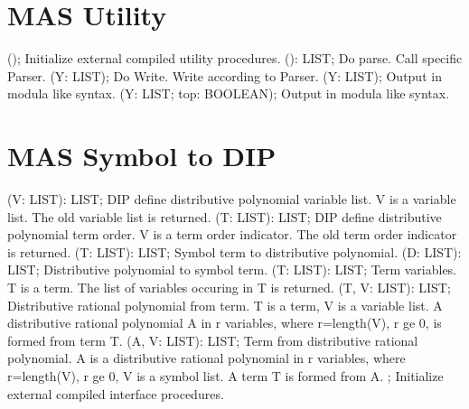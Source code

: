 \section{ MAS Utility  } 
 (); \eproc
\bcom Initialize external compiled utility procedures.  \ecom 
{} (): LIST; \eproc
\bcom Do parse. Call specific Parser.  \ecom 
{} (Y: LIST); \eproc
\bcom Do Write. Write according to Parser.  \ecom 
{} (Y: LIST); \eproc
\bcom Output in modula like syntax.  \ecom 
{} (Y: LIST; top: BOOLEAN); \eproc
\bcom Output in modula like syntax.  \ecom 
\section{ MAS Symbol to DIP  } 
 (V: LIST): LIST; \eproc
\bcom DIP define distributive polynomial variable list.
V is a variable list. The old variable list is returned.  \ecom 
{} (T: LIST): LIST; \eproc
\bcom DIP define distributive polynomial term order.
V is a term order indicator. The old term order indicator 
is returned.  \ecom 
{} (T: LIST): LIST; \eproc
\bcom Symbol term to distributive polynomial.  \ecom 
{} (D: LIST): LIST; \eproc
\bcom Distributive polynomial to symbol term.  \ecom 
{} (T: LIST): LIST; \eproc
\bcom Term variables. T is a term. The list of variables
occuring in T is returned.  \ecom 
{} (T, V: LIST): LIST; \eproc
\bcom Distributive rational polynomial from term. T is a term,
V is a variable list. A distributive rational polynomial 
A in r variables, where r=length(V), r ge 0, is formed 
from term T.  \ecom 
{} (A, V: LIST): LIST; \eproc
\bcom Term from distributive rational polynomial. A is a distributive
rational polynomial in r variables, where r=length(V), r ge 0,
V is a symbol list. A term T is formed from A.  \ecom 
{} ; \eproc
\bcom Initialize external compiled interface procedures.  \ecom 
